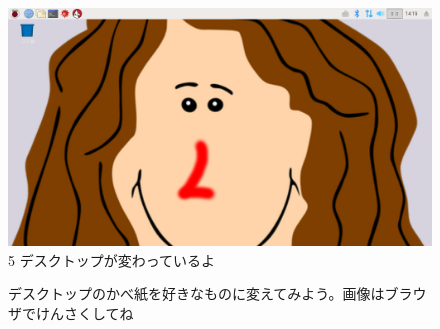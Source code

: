 \documentclass[a4paper,12pt]{jarticle}
\begin{document}
\begin{figure}
  \flushleft
  \begin{minipage}{0.45\textwidth}
    \includegraphics[width=0.85\linewidth]{textbook-img111.png}\\
    5 デスクトップが変わっているよ
  \end{minipage}

  \bigskip

  \theQuestion\label{Q:hasAnswer02-7}

  デスクトップのかべ紙を好きなものに変えてみよう。画像はブラウザでけんさくしてね
\end{figure}


\bigskip

\clearpage
\end{document}
